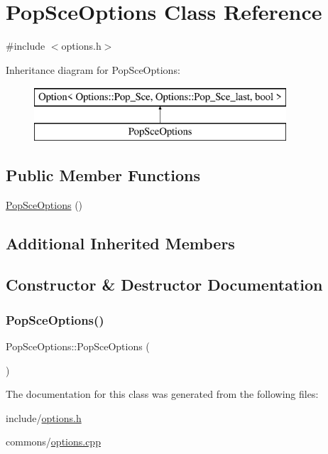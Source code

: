 \hypertarget{class_pop_sce_options}{}\section{Pop\+Sce\+Options Class Reference}
\label{class_pop_sce_options}


{\ttfamily \#include $<$options.\+h$>$}

Inheritance diagram for Pop\+Sce\+Options\+:\begin{figure}[H]
\begin{center}
\leavevmode
\includegraphics[height=2.000000cm]{d9/d91/class_pop_sce_options}
\end{center}
\end{figure}
\subsection*{Public Member Functions}
\begin{DoxyCompactItemize}
\item 
\mbox{\hyperlink{class_pop_sce_options_a63729edd40af6033d3dda6fd5b6d12e1}{Pop\+Sce\+Options}} ()
\end{DoxyCompactItemize}
\subsection*{Additional Inherited Members}


\subsection{Constructor \& Destructor Documentation}
\mbox{\label{class_pop_sce_options_a63729edd40af6033d3dda6fd5b6d12e1}} 
\subsubsection{\texorpdfstring{PopSceOptions()}{PopSceOptions()}}
{\footnotesize\ttfamily Pop\+Sce\+Options\+::\+Pop\+Sce\+Options (\begin{DoxyParamCaption}{ }\end{DoxyParamCaption})}



The documentation for this class was generated from the following files\+:\begin{DoxyCompactItemize}
\item 
include/\mbox{\hyperlink{options_8h}{options.\+h}}\item 
commons/\mbox{\hyperlink{options_8cpp}{options.\+cpp}}\end{DoxyCompactItemize}
